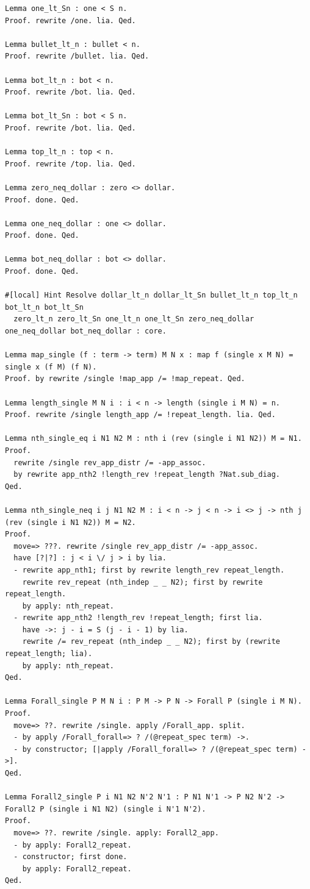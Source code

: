 \documentclass[10pt,a4paper]{amsart}
\begin{document}
\begin{lstlisting}
Lemma one_lt_Sn : one < S n.
Proof. rewrite /one. lia. Qed.

Lemma bullet_lt_n : bullet < n.
Proof. rewrite /bullet. lia. Qed.

Lemma bot_lt_n : bot < n.
Proof. rewrite /bot. lia. Qed.

Lemma bot_lt_Sn : bot < S n.
Proof. rewrite /bot. lia. Qed.

Lemma top_lt_n : top < n.
Proof. rewrite /top. lia. Qed.

Lemma zero_neq_dollar : zero <> dollar.
Proof. done. Qed.

Lemma one_neq_dollar : one <> dollar.
Proof. done. Qed.

Lemma bot_neq_dollar : bot <> dollar.
Proof. done. Qed.

#[local] Hint Resolve dollar_lt_n dollar_lt_Sn bullet_lt_n top_lt_n bot_lt_n bot_lt_Sn
  zero_lt_n zero_lt_Sn one_lt_n one_lt_Sn zero_neq_dollar one_neq_dollar bot_neq_dollar : core.

Lemma map_single (f : term -> term) M N x : map f (single x M N) = single x (f M) (f N).
Proof. by rewrite /single !map_app /= !map_repeat. Qed.

Lemma length_single M N i : i < n -> length (single i M N) = n.
Proof. rewrite /single length_app /= !repeat_length. lia. Qed.

Lemma nth_single_eq i N1 N2 M : nth i (rev (single i N1 N2)) M = N1.
Proof.
  rewrite /single rev_app_distr /= -app_assoc.
  by rewrite app_nth2 !length_rev !repeat_length ?Nat.sub_diag.
Qed.

Lemma nth_single_neq i j N1 N2 M : i < n -> j < n -> i <> j -> nth j (rev (single i N1 N2)) M = N2.
Proof.
  move=> ???. rewrite /single rev_app_distr /= -app_assoc.
  have [?|?] : j < i \/ j > i by lia.
  - rewrite app_nth1; first by rewrite length_rev repeat_length.
    rewrite rev_repeat (nth_indep _ _ N2); first by rewrite repeat_length.
    by apply: nth_repeat.
  - rewrite app_nth2 !length_rev !repeat_length; first lia.
    have ->: j - i = S (j - i - 1) by lia.
    rewrite /= rev_repeat (nth_indep _ _ N2); first by (rewrite repeat_length; lia).
    by apply: nth_repeat.
Qed.

Lemma Forall_single P M N i : P M -> P N -> Forall P (single i M N).
Proof.
  move=> ??. rewrite /single. apply /Forall_app. split.
  - by apply /Forall_forall=> ? /(@repeat_spec term) ->.
  - by constructor; [|apply /Forall_forall=> ? /(@repeat_spec term) ->].
Qed.

Lemma Forall2_single P i N1 N2 N'2 N'1 : P N1 N'1 -> P N2 N'2 -> Forall2 P (single i N1 N2) (single i N'1 N'2).
Proof.
  move=> ??. rewrite /single. apply: Forall2_app.
  - by apply: Forall2_repeat.
  - constructor; first done.
    by apply: Forall2_repeat.
Qed.


\end{lstlisting}
\end{document}
